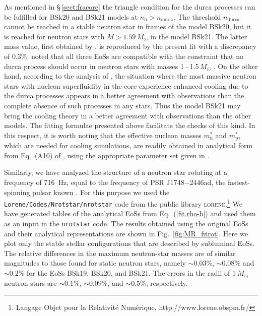 \documentclass{aa}
\newcommand{\nb}{n_\mathrm{b}}
\begin{document}
As mentioned in \S\,\ref{sect:fracore} the triangle
condition for the durca processes can be fulfilled for BSk20
and BSk21 models at $\nb>n_\mathrm{durca}$. The threshold
$n_\mathrm{durca}$ cannot be reached in a stable neutron
star in frames of the model BSk20, but it is reached for
neutron stars with $M>1.59\,M_\odot$ in the model BSk21. The
latter mass value, first obtained by \citet{Chamel-ea11}, is
reproduced by the present fit with a discrepancy of 0.3\%.
\citet{Chamel-ea11} noted that all three EoSs are compatible
with the constraint that no durca process should occur in
neutron stars with masses 1\,--\,1.5\,$M_\odot$
\citep{Klaehn-ea06}. On the other hand,  according to the analysis
of \citet{Yak-ea08}, the situation where the most massive
neutron stars with nucleon superfluidity in the core
experience enhanced cooling due to the durca processes
appears in a better agreement with observations than the
complete absence of such processes in any stars. Thus the
model BSk21 may bring the cooling theory in a better
agreement with observations than the other models. The
fitting formulae presented above facilitate the checks of
this kind.
In this respect, it is worth noting that the effective
nucleon masses $m^*_\mathrm{n}$ and $m^*_\mathrm{p}$, which are needed for
cooling simulations, are readily obtained in analytical form
from Eq.~(A10) of \citet{ChamelGP09}, using the appropriate
parameter set given in \citet{Goriely-ea10}.

Similarly, we have analyzed the structure of a neutron star
rotating at a frequency of 716~Hz, equal to the frequency of
PSR J1748$-$2446ad, the fastest-spinning pulsar known
\citep{Hessels-ea06}. For this purpose we used the
\texttt{Lorene/Codes/Nrotstar/nrotstar} code from the public
library \textsc{lorene}.\footnote{\raggedright{Langage Objet pour la
Relativit\'e Num\'erique, http://www.lorene.obspm.fr/}}
We have generated tables of the analytical EoSs from
Eq.~(\ref{fit.rho-h}) and used them as an input in the
\texttt{nrotstar} code. The results obtained using the
original EoSs and their analytical representations are shown
in Fig.~\ref{fig:MR_fitrot}. Here we plot only the stable
stellar configurations that are described by subluminal
EoSs. The relative differences in the
maximum neutron-star masses are of similar magnitudes to
those found for static neutron stars, namely $\sim 0.03$\%, 
$\sim 0.08$\% and $\sim 0.2$\% for the EoSs BSk19, BSk20,
and BSk21. The errors in the radii of  $1\ M_\odot$ neutron
stars are $\sim 0.1$\%, $\sim 0.09$\%, and $\sim 0.5$\%,
respectively. 
\end{document}
